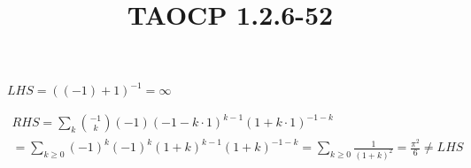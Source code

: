 \documentclass{article}
\title{TAOCP 1.2.6\mbox{-}52}
\begin{document}
\maketitle

\( LHS = {((-1) + 1)}^{-1} = \infty \)

\begin{multline*}
RHS = \sum_{k} \binom{-1}{k}(-1){(-1-k\cdot 1)}^{k-1}{(1+k \cdot 1)}^{-1-k} \\
= \sum_{k \geq 0} {(-1)}^{k} {(-1)}^{k} {(1+k)}^{k-1}{(1+k)}^{-1-k} = \sum_{k \geq 0} \frac{1}{{(1+k)}^{2}} = \frac{\pi^{2}}{6} \neq LHS
\end{multline*}
\end{document}
